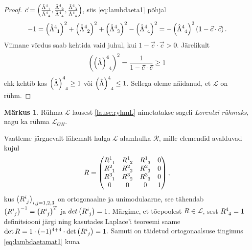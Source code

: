 \documentclass[a4paper,12pt]{article}
\theoremstyle{plain}
\theoremstyle{definition}
\newtheorem{markus}{Märkus}[section]
\numberwithin{equation}{section}
\begin{document}
\begin{proof}
$\vec{c} = \left(\frac{\hat{\Lambda}\indices{^4_1}}{\hat{\Lambda}\indices{^4_4}}, \frac{\hat{\Lambda}\indices{^4_2}}{\hat{\Lambda}\indices{^4_4}}, \frac{\hat{\Lambda}\indices{^4_3}}{\hat{\Lambda}\indices{^4_4}}\right)$, 
siis \ref{eq:lambdaeta1} põhjal
\[ -1 = \left(\hat{\Lambda}\indices{^4_1}\right)^2 + \left(\hat{\Lambda}\indices{^4_2}\right)^2 + \left(\hat{\Lambda}\indices{^4_3}\right)^2 - \left(\hat{\Lambda}\indices{^4_4}\right)^2 = - \left(\hat{\Lambda}\indices{^4_4}\right)^2 \left(1 - \vec{c} \cdot \vec{c}\right). \]
Viimane võrdus saab kehtida vaid juhul, kui $1 - \vec{c} \cdot \vec{c} > 0$. Järelikult
\[\left(\left(\hat{\Lambda}\right)\indices{^4_4}\right)^2 = \frac{1}{1 - \vec{c}\cdot\vec{c}} \geq 1\]
ehk kehtib kas $\left(\hat{\Lambda}\right)\indices{^4_4} \geq 1$ või $\left(\hat{\Lambda}\right)\indices{^4_4} \leq 1$. Sellega oleme näidanud, et $\mathcal{L}$ on rühm.
\end{proof}
\begin{markus}
Rühma $\mathcal{L}$ lausest \ref{lause:ryhmL} nimetatakse sageli \emph{Lorentzi rühmaks}, nagu ka rühma $\mathcal{L}_{GH}$.
\end{markus}
Vaatleme järgnevalt lähemalt hulga $\mathcal{L}$ alamhulka $\mathcal{R}$, mille elemendid avalduvad kujul
\[R = \begin{pmatrix}
R\indices{^1_1} & R\indices{^1_2} & R\indices{^1_3} & 0 \\ 
R\indices{^2_1} & R\indices{^2_2} & R\indices{^2_3} & 0 \\  
R\indices{^3_1} & R\indices{^3_2} & R\indices{^3_3} & 0 \\ 
0 & 0 & 0 & 1 \\ 
\end{pmatrix},\]
kus $\left(R\indices{^i_j}\right)_{i,j = 1,2,3}$ on ortogonaalne ja unimodulaarne, see tähendab $\left(R\indices{^i_j}\right)^{-1} = \left(R\indices{^i_j}\right)^T$ ja $det \left(R\indices{^i_j}\right) = 1$. Märgime, et tõepoolest $R \in \mathcal{L}$, sest $R\indices{^4_4} = 1$ definitsiooni järgi ning kasutades Laplace'i teoreemi saame $\det R = 1 \cdot (-1)^{4+4} \cdot \det \left(R\indices{^i_j}\right) = 1$. Samuti on täidetud ortogonaalsuse tingimus \ref{eq:lambdaetamat1} kuna
\end{document}
